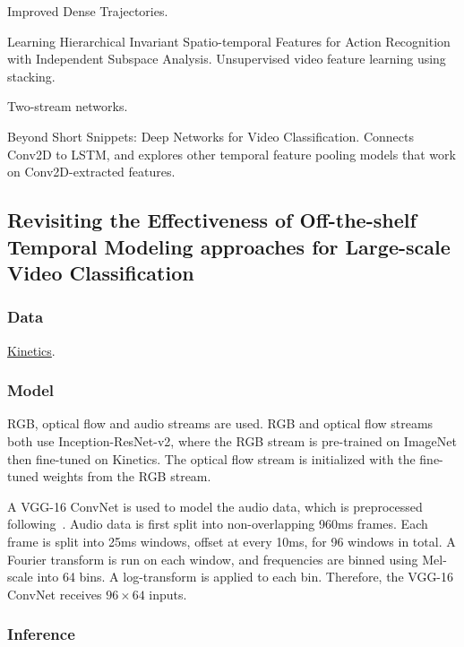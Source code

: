 \documentclass[a4paper, 12pt]{article}
\begin{document}
Improved Dense Trajectories\citet{Wang2013}.

Learning Hierarchical Invariant Spatio-temporal Features for Action Recognition
with Independent Subspace Analysis\citet{Le:2011:LHI:2191740.2192108}.
Unsupervised video feature learning using stacking.

Two-stream networks\citet{DBLP:journals/corr/SimonyanZ14}.

Beyond Short Snippets: Deep Networks for Video
Classification\citet{DBLP:journals/corr/NgHVVMT15}. Connects Conv2D to LSTM, and
explores other temporal feature pooling models that work on Conv2D-extracted
features.


\subsection{Revisiting the Effectiveness of Off-the-shelf Temporal Modeling
            approaches for Large-scale Video
            Classification\citet{2017arXiv170803805B}}

\subsubsection{Data}

\hyperref[kinetics]{Kinetics}.

\subsubsection{Model}

RGB, optical flow and audio streams are used. RGB and optical flow streams both
use Inception-ResNet-v2, where the RGB stream is pre-trained on ImageNet then
fine-tuned on Kinetics. The optical flow stream is initialized with the
fine-tuned weights from the RGB stream.

A VGG-16 ConvNet is used to model the audio data, which is preprocessed
following~\citet{DBLP:journals/corr/HersheyCEGJMPPS16}. Audio data is first
split into non-overlapping 960ms frames. Each frame is split into 25ms windows,
offset at every 10ms, for 96 windows in total. A Fourier transform is run on
each window, and frequencies are binned using Mel-scale into 64 bins. A
log-transform is applied to each bin. Therefore, the VGG-16 ConvNet receives
$96 \times 64$ inputs.

\subsubsection{Inference}
\end{document}
